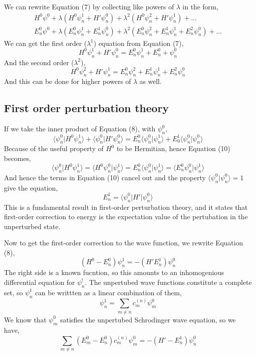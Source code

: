 We can rewrite Equation (7) by collecting like powers of $\lambda$ in the form,
\begin{multline*}
H^0\psi^0 + \lambda(H^0\psi^1_n+H'\psi_n^0) + \lambda^2(H^0\psi^2_n+H'\psi^1_n)+...\\E^0_n\psi^0 + \lambda(E^0_n\psi^1_n+E^1_n\psi_n^0) + \lambda^2(E^0_n\psi^2_n+E_n^1\psi^1_n+E^2_n\psi^0_n)+...
\end{multline*} 
We can get the first order ($\lambda^1$) equation from Equation (7),
\begin{equation}
H^0\psi_{n}^1+H'\psi^0_n=E^0_n\psi^1_n+E^0_n+\psi_n^0
\end{equation}
And the second order ($\lambda^2$),
\begin{equation}
H^0\psi_{n}^2+H'\psi^1_n=E^0_n\psi^2_n+E^1_n\psi^1_n+E^2_n\psi^0_n
\end{equation}
And this can be done for higher powers of $\lambda$ as well.

\subsection{First order perturbation theory}
If we take the inner product of Equation (8), with $\psi^0_n$,
\begin{equation}
\langle\psi^0_n\vert H^0\psi^1_n\rangle + \langle\psi^0_n\vert H'\psi^0_n\rangle=E^0_n\langle\psi^0_n\vert\psi^1_n\rangle +E^1_0\langle\psi^0_n\vert\psi^0_n\rangle
\end{equation}
Because of the useful property of $H^0$ to be Hermitian, hence Equation (10) becomes,
\begin{equation}
\langle\psi^0_n\vert H^0\psi^1_n\rangle=\langle H^0\psi^0_n\vert \psi^1_n\rangle=E^0_n\langle\psi^0_n\vert\psi^1_n\rangle=\langle E^0_n\psi^0_n\vert\psi^1_n\rangle
\end{equation}
And hence the terms in Equation (10) cancel out and the property $\langle\psi^0_n\vert\psi^0_n\rangle=1$ give the equation,
\begin{equation}
E^1_n=\langle\psi_n^0\vert H'\vert\psi^0_n\rangle
\end{equation}
This is a fundamental result in first-order perturbation theory, and it states that first-order correction to energy is the expectation value of the pertubation in the unperturbed state.

Now to get the first-order correction to the wave function, we rewrite Equation (8),
\begin{equation}
(H^0-E^0_n)\psi^1_n=-(H'E^1_n)\psi^0_n
\end{equation}
The right side is a known fucntion, so this amounts to an inhomogenious differential equation for $\psi^!_n$. The unpertubed wave functions constitute a complete set, so $\psi^1_n$ can be writtten as a linear combination of them,
\begin{equation}
\psi^1_n=\sum_{m\neq n}c^{(n)}_m\psi^0_m
\end{equation}
We know that $\psi^0_m$ satisfies the unpertubed Schrodinger wave equation, so we have,
\begin{equation}
\sum_{m\neq n}^{}(E^0_m-E^0_n)c^{(n)}_m\psi^0_m=-(H'-E^1_n)\psi^0_n
\end{equation}

